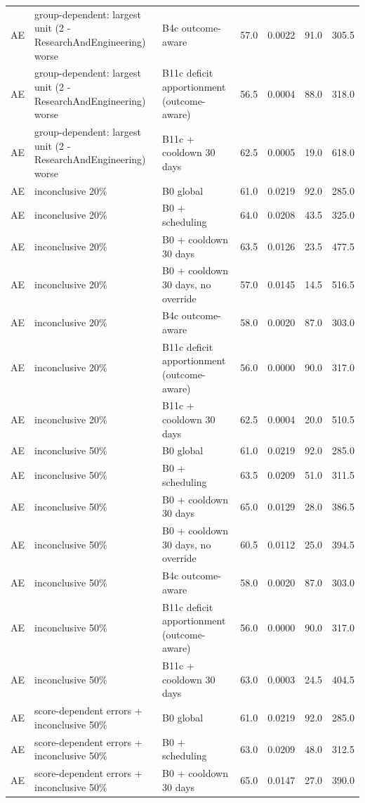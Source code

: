 \documentclass[10pt,onecolumn,letterpaper]{article}
\begin{document}
\begin{longtable}{lp{5.2cm}p{4.4cm}cccc}
AE & group-dependent: largest unit (2 - ResearchAndEngineering) worse & B4c outcome-aware & 57.0 & 0.0022 & 91.0 & 305.5 \\
AE & group-dependent: largest unit (2 - ResearchAndEngineering) worse & B11c deficit apportionment (outcome-aware) & 56.5 & 0.0004 & 88.0 & 318.0 \\
AE & group-dependent: largest unit (2 - ResearchAndEngineering) worse & B11c + cooldown 30 days & 62.5 & 0.0005 & 19.0 & 618.0 \\
AE & inconclusive 20\% & B0 global & 61.0 & 0.0219 & 92.0 & 285.0 \\
AE & inconclusive 20\% & B0 + scheduling & 64.0 & 0.0208 & 43.5 & 325.0 \\
AE & inconclusive 20\% & B0 + cooldown 30 days & 63.5 & 0.0126 & 23.5 & 477.5 \\
AE & inconclusive 20\% & B0 + cooldown 30 days, no override & 57.0 & 0.0145 & 14.5 & 516.5 \\
AE & inconclusive 20\% & B4c outcome-aware & 58.0 & 0.0020 & 87.0 & 303.0 \\
AE & inconclusive 20\% & B11c deficit apportionment (outcome-aware) & 56.0 & 0.0000 & 90.0 & 317.0 \\
AE & inconclusive 20\% & B11c + cooldown 30 days & 62.5 & 0.0004 & 20.0 & 510.5 \\
AE & inconclusive 50\% & B0 global & 61.0 & 0.0219 & 92.0 & 285.0 \\
AE & inconclusive 50\% & B0 + scheduling & 63.5 & 0.0209 & 51.0 & 311.5 \\
AE & inconclusive 50\% & B0 + cooldown 30 days & 65.0 & 0.0129 & 28.0 & 386.5 \\
AE & inconclusive 50\% & B0 + cooldown 30 days, no override & 60.5 & 0.0112 & 25.0 & 394.5 \\
AE & inconclusive 50\% & B4c outcome-aware & 58.0 & 0.0020 & 87.0 & 303.0 \\
AE & inconclusive 50\% & B11c deficit apportionment (outcome-aware) & 56.0 & 0.0000 & 90.0 & 317.0 \\
AE & inconclusive 50\% & B11c + cooldown 30 days & 63.0 & 0.0003 & 24.5 & 404.5 \\
AE & score-dependent errors + inconclusive 50\% & B0 global & 61.0 & 0.0219 & 92.0 & 285.0 \\
AE & score-dependent errors + inconclusive 50\% & B0 + scheduling & 63.0 & 0.0209 & 48.0 & 312.5 \\
AE & score-dependent errors + inconclusive 50\% & B0 + cooldown 30 days & 65.0 & 0.0147 & 27.0 & 390.0 \\

\end{longtable}
\end{document}
